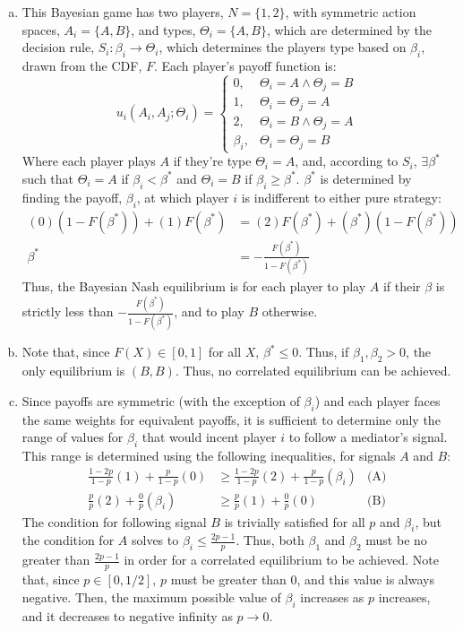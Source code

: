 \documentclass{article}
\begin{document}
\begin{enumerate}[(a)]
	
	\item This Bayesian game has two players, ${N=\{1,2\}}$, with symmetric action spaces, ${A_i=\{A,B\}}$, and types, ${\Theta_i=\{A,B\}}$, which are determined by the decision rule, ${S_i:\beta_i\rightarrow\Theta_i}$, which determines the players type based on $\beta_i$, drawn from the CDF, $F$. Each player's payoff function is:
		\[
			u_i(A_i,A_j;\Theta_i) = 	\begin{cases}
										0, 			& \Theta_i = A\land \Theta_j = B	\\
										1, 			& \Theta_i = \Theta_j = A 			\\
										2, 			& \Theta_i = B\land \Theta_j = A	\\
										\beta_i, 	& \Theta_i = \Theta_j = B
									\end{cases}
		\]
		Where each player plays $A$ if they're type $\Theta_i=A$, and, according to $S_i$, $\exists\beta^*$ such that ${\Theta_i=A}$ if ${\beta_i<\beta^*}$ and ${\Theta_i=B}$ if ${\beta_i\geq\beta^*}$. $\beta^*$ is determined by finding the payoff, $\beta_i$, at which player $i$ is indifferent to either pure strategy:
			\begin{align*}
				(0)(1-F(\beta^*)) + (1)F(\beta^*) &= (2)F(\beta^*) + (\beta^*)(1-F(\beta^*))	\\
					\beta^* &= -\frac{F(\beta^*)}{1-F(\beta^*)}
			\end{align*}
		Thus, the Bayesian Nash equilibrium is for each player to play $A$ if their $\beta$ is strictly less than $-\frac{F(\beta^*)}{1-F(\beta^*)}$, and to play $B$ otherwise.
	
	
	\item Note that, since ${F(X)\in[0,1]}$ for all $X$, $\beta^*\leq0$. Thus, if ${\beta_1,\beta_2>0}$, the only equilibrium is $(B,B)$. Thus, no correlated equilibrium can be achieved.
	
	
	\item Since payoffs are symmetric (with the exception of $\beta_i$) and each player faces the same weights for equivalent payoffs, it is sufficient to determine only the range of values for $\beta_i$ that would incent player $i$ to follow a mediator's signal. This range is determined using the following inequalities, for signals $A$ and $B$:
		\begin{align*}
			\frac{1-2p}{1-p}(1) + \frac{p}{1-p}(0) &\geq \frac{1-2p}{1-p}(2) + \frac{p}{1-p}(\beta_i) &\text{(A)}	\\
			\frac{p}{p}(2) + \frac{0}{p}(\beta_i) &\geq \frac{p}{p}(1) + \frac{0}{p}(0) &\text{(B)}
		\end{align*}
		The condition for following signal $B$ is trivially satisfied for all $p$ and $\beta_i$, but the condition for $A$ solves to ${\beta_i\leq\frac{2p-1}{p}}$. Thus, both $\beta_1$ and $\beta_2$ must be no greater than $\frac{2p-1}{p}$ in order for a correlated equilibrium to be achieved. Note that, since ${p\in[0,1/2]}$, $p$ must be greater than 0, and this value is always negative. Then, the maximum possible value of $\beta_i$ increases as $p$ increases, and it decreases to negative infinity as $p\rightarrow 0$.
	
\end{enumerate}
\end{document}
